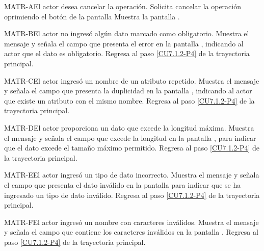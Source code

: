 	\begin{UCtrayectoriaA}{MATR-A}{El actor desea cancelar la operación.}
		\UCpaso[\UCactor] Solicita cancelar la operación oprimiendo el botón  de la pantalla 
		\UCpaso[\UCsist] Muestra la pantalla .
	\end{UCtrayectoriaA}

	\begin{UCtrayectoriaA}{MATR-B}{El actor no ingresó algún dato marcado como obligatorio.}
		\UCpaso[\UCsist] Muestra el mensaje  y señala el campo que presenta el error en la pantalla , indicando al actor que el dato es obligatorio.
		\UCpaso Regresa al paso \ref{CU7.1.2-P4} de la trayectoria principal.
	\end{UCtrayectoriaA}
	
	\begin{UCtrayectoriaA}{MATR-C}{El actor ingresó un nombre de un atributo repetido.}
		\UCpaso[\UCsist] Muestra el mensaje  y señala el campo que presenta la duplicidad en la pantalla , indicando al actor que existe un atributo con el mismo nombre.
		\UCpaso Regresa al paso \ref{CU7.1.2-P4} de la trayectoria principal.
	\end{UCtrayectoriaA}

	\begin{UCtrayectoriaA}{MATR-D}{El actor proporciona un dato que excede la longitud máxima.}
		\UCpaso[\UCsist] Muestra el mensaje  y señala el campo que excede la longitud en la pantalla , para indicar que el dato excede el tamaño máximo permitido.
		\UCpaso Regresa al paso \ref{CU7.1.2-P4} de la trayectoria principal.
	\end{UCtrayectoriaA}

	\begin{UCtrayectoriaA}{MATR-E}{El actor ingresó un tipo de dato incorrecto.}
		\UCpaso[\UCsist] Muestra el mensaje  y señala el campo que presenta el dato inválido en la pantalla  para indicar que se ha ingresado un tipo de dato inválido.
		\UCpaso Regresa al paso \ref{CU7.1.2-P4} de la trayectoria principal.
	\end{UCtrayectoriaA}

	\begin{UCtrayectoriaA}{MATR-F}{El actor ingresó un nombre con caracteres inválidos.}
	\UCpaso[\UCsist] Muestra el mensaje  y señala el campo que contiene los caracteres inválidos en la pantalla .
	\UCpaso Regresa al paso \ref{CU7.1.2-P4} de la trayectoria principal.
	\end{UCtrayectoriaA}

